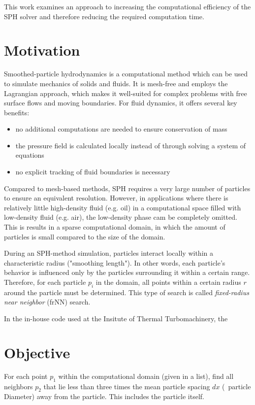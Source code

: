 This work examines an approach to increasing the computational efficiency of the SPH solver and therefore reducing the required computation time. 

\chapter{Motivation}

Smoothed-particle hydrodynamics is a computational method which can be used to simulate mechanics of solids and fluids.  It is mesh-free and employs the Lagrangian approach, which makes it well-suited for complex problems with free surface flows and moving boundaries.  For fluid dynamics, it offers several key benefits:

\begin{itemize}
\item no additional computations are needed to ensure conservation of mass
\item the pressure field is calculated locally instead of through solving a system of equations
\item no explicit tracking of fluid boundaries is necessary
\end{itemize}

Compared to mesh-based methods, SPH requires a very large number of particles to ensure an equivalent resolution.  However, in applications where there is relatively little high-density fluid (e.g.  oil) in a computational space filled with low-density fluid (e.g.  air), the low-density phase cam be completely omitted.  This is results in a sparse computational domain, in which the amount of particles is small compared to the size of the domain.


During an SPH-method simulation, particles interact locally within a characteristic radius ("smoothing length").  In other words, each particle's behavior is influenced only by the particles surrounding it within a certain range.  Therefore, for each particle $p_i$ in the domain, all points within a certain radius $r$ around the particle must be determined.  This type of search is called {\it fixed-radius near neighbor} (frNN) search.

In the in-house code used at the Insitute of Thermal Turbomachinery, the 

\chapter{Objective}

For each point $p_1$ within the computational domain (given in a list), find all neighbors $p_2$ that lie less than three times the mean particle spacing $dx$ (~particle Diameter) away from the particle. This includes the particle itself. 

